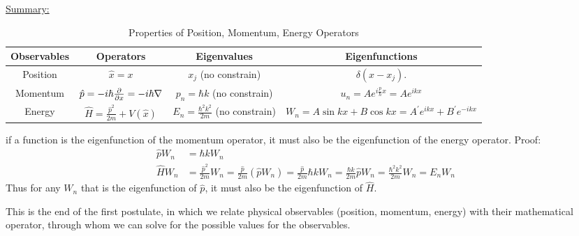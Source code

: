 \documentclass{school-22.101-notes}
\begin{document}
\uline{Summary: }
\begin{table}
\begin{tabular}{|c|c|c|c|} \hline
Observables & Operators & Eigenvalues & Eigenfunctions \\ \hline
Position & $\hat{x} = x$ & $x_j$ (no constrain) & $\delta(x-x_j)$. \\ \hline
Momentum & $\hat{p} = -i\hbar \frac{\partial}{\partial x} = - i \hbar \nabla $ & $p_n = \hbar k$ (no constrain) & $u_n = A e^{i \frac{p}{\hbar} x } = A e^{i k x} $ \\ \hline
Energy & $\hat{H} = \frac{\hat{p}^2}{2m} + V(\hat{x}) $ & $E_n = \frac{\hbar^2 k^2}{2m}$ (no constrain) & $W_n = A \sin kx + B \cos kx = A^{\prime} e^{ikx} + B^{\prime} e^{-ikx} $\\ \hline
\end{tabular}
\caption{Properties of Position, Momentum, Energy Operators}
\end{table}
if a function is the eigenfunction of the momentum operator, it must also be the eigenfunction of the energy operator. Proof:
\begin{align}
\hat{p} W_n &= \hbar k W_n \\
\hat{H} W_n &= \frac{\hat{p}^2}{2m} W_n 
= \frac{\hat{p}}{2m} (\hat{p} W_n) 
= \frac{\hat{p}}{2m} \hbar k W_n = \frac{\hbar k}{2m} \hat{p} W_n = \frac{\hbar^2 k^2}{2m} W_n = E_n W_n
\end{align}
Thus for any $W_n$ that is the eigenfunction of $\hat{p}$, it must also be the eigenfunction of $\hat{H}$.

This is the end of the first postulate, in which we relate physical observables (position, momentum, energy) with their mathematical operator, through whom we can solve for the possible values for the observables. 
\end{document}
